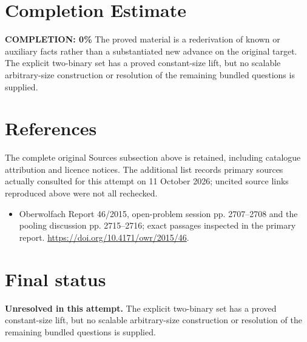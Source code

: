 \documentclass[11pt]{article}
\begin{document}
\section{Completion Estimate}
\noindent\textbf{COMPLETION: 0\%}
The proved material is a rederivation of known or auxiliary facts rather than a substantiated new advance on the original target. The explicit two-binary set has a proved constant-size lift, but no scalable arbitrary-size construction or resolution of the remaining bundled questions is supplied.
\section{References}
The complete original Sources subsection above is retained, including catalogue attribution and licence notices. The additional list records primary sources actually consulted for this attempt on 11 October 2026; uncited source links reproduced above were not all rechecked.
\begin{itemize}
\item Oberwolfach Report 46/2015, open-problem session pp. 2707--2708 and the pooling discussion pp. 2715--2716; exact passages inspected in the primary report. \url{https://doi.org/10.4171/owr/2015/46}.
\end{itemize}
\section{Final status}
\textbf{Unresolved in this attempt.} The explicit two-binary set has a proved constant-size lift, but no scalable arbitrary-size construction or resolution of the remaining bundled questions is supplied.
\end{document}
